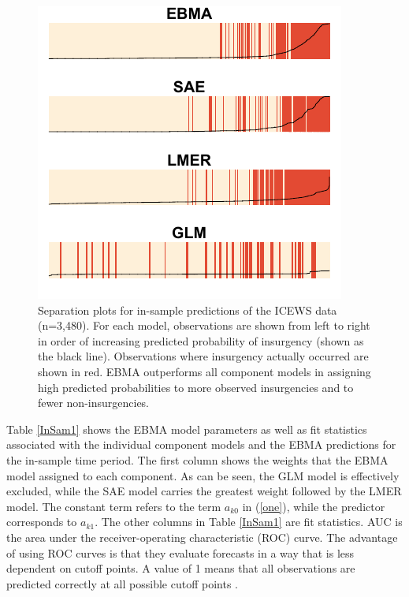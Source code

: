 \documentclass[pdftex,12pt,fullpage,oneside]{amsart}
\begin{document}
\begin{figure}
\hspace{-10pt}
\vspace{-15pt}
  \caption{\footnotesize Separation plots for in-sample predictions of
    the ICEWS data (n=3,480). For each model, observations are shown
    from left to right in order of increasing predicted probability of
    insurgency (shown as the black line). Observations where
    insurgency actually occurred are shown in red. EBMA outperforms
    all component models in assigning high predicted probabilities to
    more observed insurgencies and to fewer non-insurgencies.}
\label{InSam1sep}
\centering
\includegraphics[]{Insamplenew.pdf}
\vspace{-20pt}
\end{figure}



Table \ref{InSam1} shows the EBMA model parameters as well as fit
statistics associated with the individual component models and the
EBMA predictions for the in-sample time period. The first column shows
the weights that the EBMA model assigned to each component. As can be
seen, the GLM model is effectively excluded, while the SAE model
carries the greatest weight followed by the LMER model.  The constant
term refers to the term $a_{k0}$ in (\ref{one}), while the predictor
corresponds to $a_{k1}$.  The other columns in Table \ref{InSam1} are
fit statistics.  AUC is the area under the receiver-operating
characteristic (ROC) curve. The advantage of using ROC curves is that
they evaluate forecasts in a way that is less dependent on cutoff
points.  A value of 1 means that all observations are predicted
correctly at all possible cutoff points \citep{King:Zeng:2001}.
\end{document}
